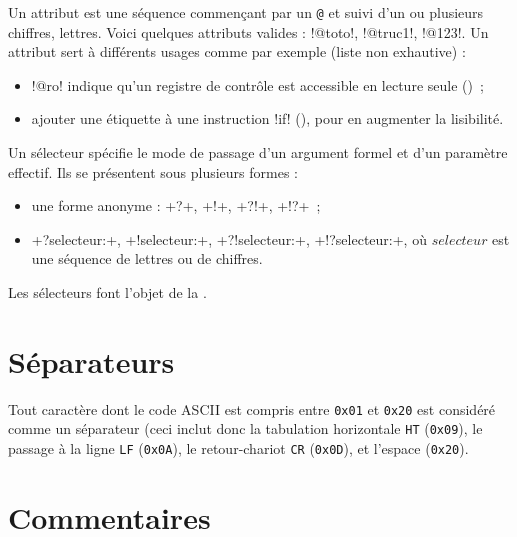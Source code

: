 

Un attribut est une séquence commençant par un \texttt{@} et suivi d'un ou plusieurs chiffres, lettres. Voici quelques attributs valides : \omnibus!@toto!, \omnibus!@truc1!, \omnibus!@123!. Un attribut sert à différents usages comme par exemple (liste non exhautive) :
\begin{itemize}
  \item \omnibus!@ro! indique qu'un registre de contrôle est accessible en lecture seule ()~;
  \item ajouter une étiquette à une instruction \omnibus!if! (), pour en augmenter la lisibilité.
\end{itemize}









Un sélecteur spécifie le mode de passage d'un argument formel et d'un paramètre effectif. Ils se présentent sous plusieurs formes :
\begin{itemize}
  \item une forme anonyme : \omnibus+?+, \omnibus+!+, \omnibus+?!+, \omnibus+!?+~;
  \item \omnibus+?selecteur:+, \omnibus+!selecteur:+, \omnibus+?!selecteur:+, \omnibus+!?selecteur:+, où $selecteur$ est une séquence de lettres ou de chiffres.
\end{itemize}



Les sélecteurs font l'objet de la .

\section{Séparateurs}

Tout caractère dont le code ASCII est compris entre \texttt{0x01} et \texttt{0x20} est considéré comme un séparateur (ceci inclut donc la tabulation horizontale \texttt{HT} (\texttt{0x09}), le passage à la ligne \texttt{LF} (\texttt{0x0A}), le retour-chariot \texttt{CR} (\texttt{0x0D}), et l’espace (\texttt{0x20}).









\section{Commentaires}

